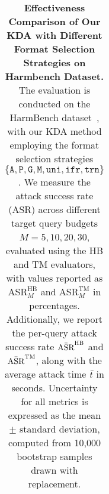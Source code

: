 \begin{table}[t]
{\begin{tabular}{c|c||c|c|c|c||c|c|c}
\hline
\end{tabular}
}
\caption{
\textbf{Effectiveness Comparison of Our KDA with Different Format Selection Strategies on Harmbench Dataset.} The evaluation is conducted on the HarmBench dataset~\citep{chao_jailbreaking_2024}, with our KDA method employing the format selection strategies $ \{\texttt{A},\texttt{P}, \texttt{G}, \texttt{M}, \texttt{uni}, \texttt{ifr}, \texttt{trn}\}$. We measure the attack success rate (ASR) across different target query budgets $M=5,10,20,30$, evaluated using the HB and TM evaluators, with values reported as $\text{ASR}^{\text{HB}}_{M}$ and $\text{ASR}^{\text{TM}}_{M}$ in percentages. Additionally, we report the per-query attack success rate $\Bar{\text{ASR}}^{\text{HB}}$ and $\Bar{\text{ASR}}^{\text{TM}}$, along with the average attack time $\Bar{t}$ in seconds. Uncertainty for all metrics is expressed as the mean $\pm$ standard deviation, computed from 10,000 bootstrap samples drawn with replacement.
}
\end{table}











